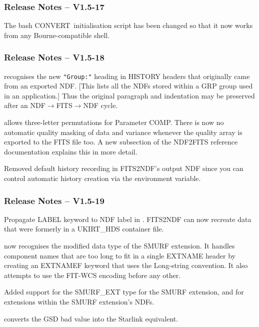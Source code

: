 \documentclass[twoside,11pt]{starlink}
\providecommand{\CONVERT}{{\footnotesize CONVERT}}
\begin{document}
\subsubsection{Release Notes -- V1.5-17}

The bash \CONVERT\ initialisation script has been changed so that it
now works from any Bourne-compatible shell.

\subsubsection{Release Notes -- V1.5-18}

 recognises the new {\tt "Group:"} heading
in HISTORY headers that originally came from an exported NDF.  [This
lists all the NDFs stored within a GRP group used in an application.]
Thus the original paragraph and indentation may be preserved after an
NDF$\rightarrow$FITS$\rightarrow$NDF cycle.

 allows three-letter permutations for
Parameter COMP.  There is now no automatic quality masking of data
and variance whenever the quality array is exported to the FITS file
too.  A new subsection of the NDF2FITS reference documentation explains
this in more detail.

Removed default history recording in FITS2NDF's output NDF since
you can control automatic history creation via the
environment variable.

\subsubsection{Release Notes -- V1.5-19}

Propagate LABEL keyword to NDF label in .
FITS2NDF can now recreate data that were formerly in a UKIRT\_HDS
container file.

 now recognises the modified data type of
the SMURF extension.  It handles component names that are too long
to fit in a single EXTNAME header by creating an EXTNAMEF keyword that
uses the Long-string convention.  It also attempts to use the FIT-WCS
encoding before any other.

Added support for the SMURF\_EXT type for the SMURF extension, and for
extensions within the SMURF extension's NDFs.

 converts the GSD bad value into the
Starlink equivalent.
\end{document}
